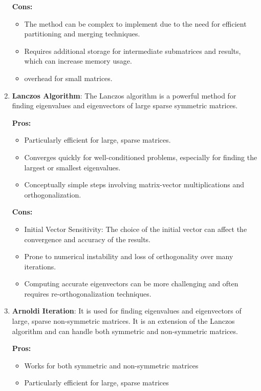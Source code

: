 \documentclass{article}
\theoremstyle{remark}
\begin{document}
\begin{enumerate}
    \textbf{Cons:}
    \begin{itemize}
        \item The method can be complex to implement due to the need for efficient partitioning and merging techniques.

        \item Requires additional storage for intermediate submatrices and results, which can increase memory usage.

        \item overhead for small matrices.
        
    \end{itemize}

    \item \textbf{Lanczos Algorithm}: The Lanczos algorithm is a powerful method for finding eigenvalues and eigenvectors of large sparse symmetric matrices.

    \textbf{Pros:}
    \begin{itemize}
        \item Particularly efficient for large, sparse matrices.
        \item Converges quickly for well-conditioned problems, especially for finding the largest or smallest eigenvalues.
        \item Conceptually simple steps involving matrix-vector multiplications and orthogonalization.
    \end{itemize}

    \textbf{Cons:}
    \begin{itemize}
        \item Initial Vector Sensitivity: The choice of the initial vector can affect the convergence and accuracy of the results.
        \item Prone to numerical instability and loss of orthogonality over many iterations.
        \item Computing accurate eigenvectors can be more challenging and often requires re-orthogonalization techniques.
    \end{itemize}

    \item \textbf{Arnoldi Iteration}: It is used for finding eigenvalues and eigenvectors of large, sparse non-symmetric matrices. It is an extension of the Lanczos algorithm and can handle both symmetric and non-symmetric matrices.

    \textbf{Pros:}
    \begin{itemize}
        \item Works for both symmetric and non-symmetric matrices
        \item Particularly efficient for large, sparse matrices
    \end{itemize}


\end{enumerate}
\end{document}

